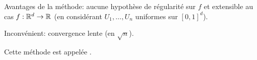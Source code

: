 \begin{example}
    \ptr{} Avantages de la méthode: aucune hypothèse
    de régularité sur \(f\) et extensible au cas
    \(f:\mathbb{R}^d\to\mathbb{R}\) (en considérant 
    \(U_1,\ldots,U_n\) uniformes sur \([0,1]^d\)).

    \ptr{} Inconvénient: convergence lente (en \(\sqrt n\)).

    Cette méthode est appelée .
\end{example}